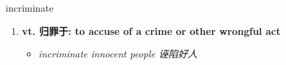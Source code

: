 
\begin{frame}
{\huge incriminate}
\begin{center}
\begin{enumerate}\Large
  \item \textbf{vt. 归罪于: to accuse of a crime or other wrongful act}
  \begin{itemize}
    \item \em{\Large{incriminate innocent people 诬陷好人}}
  \end{itemize}
\end{enumerate}
\end{center}
\end{frame}
